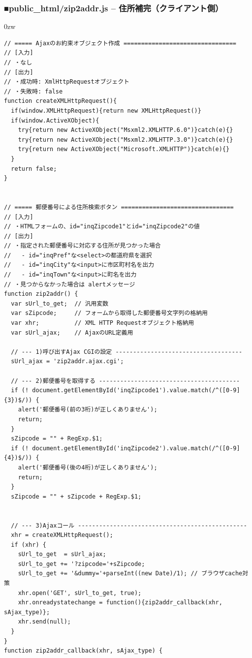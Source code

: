 \subsubsection*{■public\_{}html/zip2addr.js -- 住所補完（クライアント側）}

\begin{indentation}{-9mm}{0zw}
\begin{verbatim}
// ===== Ajaxのお約束オブジェクト作成 ================================
// [入力]
// ・なし
// [出力]
// ・成功時: XmlHttpRequestオブジェクト
// ・失敗時: false
function createXMLHttpRequest(){
  if(window.XMLHttpRequest){return new XMLHttpRequest()}
  if(window.ActiveXObject){
    try{return new ActiveXObject("Msxml2.XMLHTTP.6.0")}catch(e){}
    try{return new ActiveXObject("Msxml2.XMLHTTP.3.0")}catch(e){}
    try{return new ActiveXObject("Microsoft.XMLHTTP")}catch(e){}
  }
  return false;
}


// ===== 郵便番号による住所検索ボタン ================================
// [入力]
// ・HTMLフォームの、id="inqZipcode1"とid="inqZipcode2"の値
// [出力]
// ・指定された郵便番号に対応する住所が見つかった場合
//   - id="inqPref"な<select>の都道府県を選択
//   - id="inqCity"な<input>に市区町村名を出力
//   - id="inqTown"な<input>に町名を出力
// ・見つからなかった場合は alertメッセージ
function zip2addr() {
  var sUrl_to_get;  // 汎用変数
  var sZipcode;     // フォームから取得した郵便番号文字列の格納用
  var xhr;          // XML HTTP Requestオブジェクト格納用
  var sUrl_ajax;    // AjaxのURL定義用

  // --- 1)呼び出すAjax CGIの設定 ------------------------------------
  sUrl_ajax = 'zip2addr.ajax.cgi';

  // --- 2)郵便番号を取得する ----------------------------------------
  if (! document.getElementById('inqZipcode1').value.match(/^([0-9]{3})$/)) {
    alert('郵便番号(前の3桁)が正しくありません');
    return;
  }
  sZipcode = "" + RegExp.$1;
  if (! document.getElementById('inqZipcode2').value.match(/^([0-9]{4})$/)) {
    alert('郵便番号(後の4桁)が正しくありません');
    return;
  }
  sZipcode = "" + sZipcode + RegExp.$1;


  // --- 3)Ajaxコール ------------------------------------------------
  xhr = createXMLHttpRequest();
  if (xhr) {
    sUrl_to_get  = sUrl_ajax;
    sUrl_to_get += '?zipcode='+sZipcode;
    sUrl_to_get += '&dummy='+parseInt((new Date)/1); // ブラウザcache対策
    xhr.open('GET', sUrl_to_get, true);
    xhr.onreadystatechange = function(){zip2addr_callback(xhr, sAjax_type)};
    xhr.send(null);
  }
}
function zip2addr_callback(xhr, sAjax_type) {


\end{verbatim}
\end{indentation}
